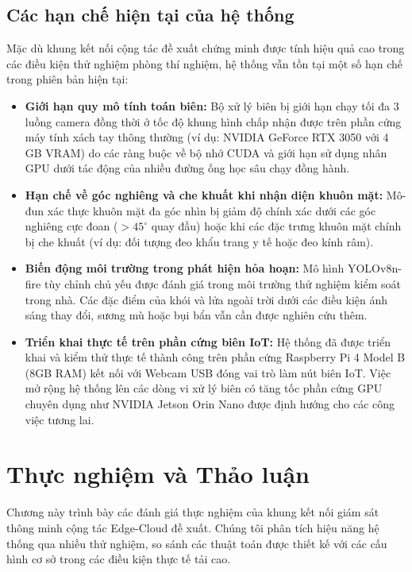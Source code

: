 \documentclass[12pt,a4paper]{article}
\begin{document}
\subsection{Các hạn chế hiện tại của hệ thống}
Mặc dù khung kết nối cộng tác đề xuất chứng minh được tính hiệu quả cao trong các điều kiện thử nghiệm phòng thí nghiệm, hệ thống vẫn tồn tại một số hạn chế trong phiên bản hiện tại:
\begin{itemize}
    \item \textbf{Giới hạn quy mô tính toán biên:} Bộ xử lý biên bị giới hạn chạy tối đa 3 luồng camera đồng thời ở tốc độ khung hình chấp nhận được trên phần cứng máy tính xách tay thông thường (ví dụ: NVIDIA GeForce RTX 3050 với 4 GB VRAM) do các ràng buộc về bộ nhớ CUDA và giới hạn sử dụng nhân GPU dưới tác động của nhiều đường ống học sâu chạy đồng hành.
    \item \textbf{Hạn chế về góc nghiêng và che khuất khi nhận diện khuôn mặt:} Mô-đun xác thực khuôn mặt đa góc nhìn bị giảm độ chính xác dưới các góc nghiêng cực đoan ($>45^{\circ}$ quay đầu) hoặc khi các đặc trưng khuôn mặt chính bị che khuất (ví dụ: đối tượng đeo khẩu trang y tế hoặc đeo kính râm).
    \item \textbf{Biến động môi trường trong phát hiện hỏa hoạn:} Mô hình YOLOv8n-fire tùy chỉnh chủ yếu được đánh giá trong môi trường thử nghiệm kiểm soát trong nhà. Các đặc điểm của khói và lửa ngoài trời dưới các điều kiện ánh sáng thay đổi, sương mù hoặc bụi bẩn vẫn cần được nghiên cứu thêm.
    \item \textbf{Triển khai thực tế trên phần cứng biên IoT:} Hệ thống đã được triển khai và kiểm thử thực tế thành công trên phần cứng Raspberry Pi 4 Model B (8GB RAM) kết nối với Webcam USB đóng vai trò làm nút biên IoT. Việc mở rộng hệ thống lên các dòng vi xử lý biên có tăng tốc phần cứng GPU chuyên dụng như NVIDIA Jetson Orin Nano được định hướng cho các công việc tương lai.
\end{itemize}

\newpage

\section{Thực nghiệm và Thảo luận}

Chương này trình bày các đánh giá thực nghiệm của khung kết nối giám sát thông minh cộng tác Edge-Cloud đề xuất. Chúng tôi phân tích hiệu năng hệ thống qua nhiều thử nghiệm, so sánh các thuật toán được thiết kế với các cấu hình cơ sở trong các điều kiện thực tế tải cao.
\end{document}
